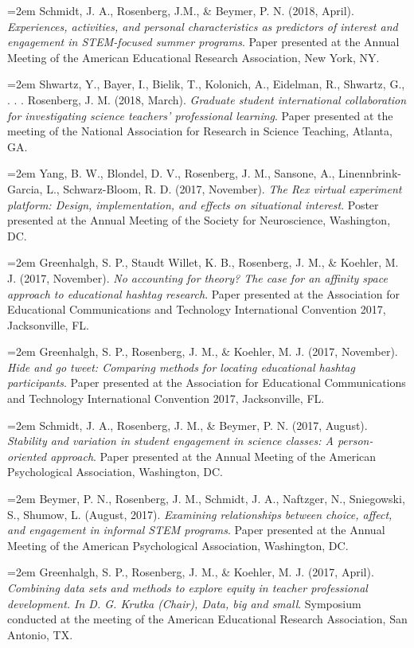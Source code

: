 \documentclass[14,]{article}
\begin{document}
\hangindent=2em Schmidt, J. A., Rosenberg, J.M., \& Beymer, P. N. (2018,
April). \emph{Experiences, activities, and personal characteristics as
predictors of interest and engagement in STEM-focused summer programs}.
Paper presented at the Annual Meeting of the American Educational
Research Association, New York, NY.

\hangindent=2em Shwartz, Y., Bayer, I., Bielik, T., Kolonich, A.,
Eidelman, R., Shwartz, G., . . . Rosenberg, J. M. (2018, March).
\emph{Graduate student international collaboration for investigating
science teachers' professional learning}. Paper presented at the meeting
of the National Association for Research in Science Teaching, Atlanta,
GA.

\hangindent=2em Yang, B. W., Blondel, D. V., Rosenberg, J. M., Sansone,
A., Linennbrink-Garcia, L., Schwarz-Bloom, R. D. (2017, November).
\emph{The Rex virtual experiment platform: Design, implementation, and
effects on situational interest}. Poster presented at the Annual Meeting
of the Society for Neuroscience, Washington, DC.

\hangindent=2em Greenhalgh, S. P., Staudt Willet, K. B., Rosenberg, J.
M., \& Koehler, M. J. (2017, November). \emph{No accounting for theory?
The case for an affinity space approach to educational hashtag
research}. Paper presented at the Association for Educational
Communications and Technology International Convention 2017,
Jacksonville, FL.

\hangindent=2em Greenhalgh, S. P., Rosenberg, J. M., \& Koehler, M. J.
(2017, November). \emph{Hide and go tweet: Comparing methods for
locating educational hashtag participants}. Paper presented at the
Association for Educational Communications and Technology International
Convention 2017, Jacksonville, FL.

\hangindent=2em Schmidt, J. A., Rosenberg, J. M., \& Beymer, P. N.
(2017, August). \emph{Stability and variation in student engagement in
science classes: A person-oriented approach}. Paper presented at the
Annual Meeting of the American Psychological Association, Washington,
DC.

\hangindent=2em Beymer, P. N., Rosenberg, J. M., Schmidt, J. A.,
Naftzger, N., Sniegowski, S., Shumow, L. (August, 2017). \emph{Examining
relationships between choice, affect, and engagement in informal STEM
programs}. Paper presented at the Annual Meeting of the American
Psychological Association, Washington, DC.

\hangindent=2em Greenhalgh, S. P., Rosenberg, J. M., \& Koehler, M. J.
(2017, April). \emph{Combining data sets and methods to explore equity
in teacher professional development. In D. G. Krutka (Chair), Data, big
and small}. Symposium conducted at the meeting of the American
Educational Research Association, San Antonio, TX.
\end{document}
